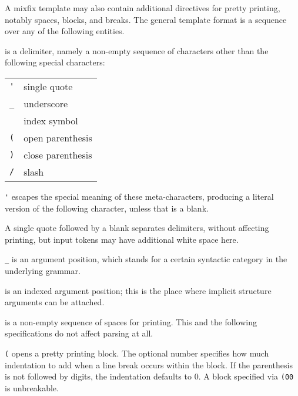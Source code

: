 \begin{isabellebody}
\begin{isamarkuptext}
  \medskip A mixfix template may also contain additional directives
  for pretty printing, notably spaces, blocks, and breaks.  The
  general template format is a sequence over any of the following
  entities.

  \begin{description}

  \item {} is a delimiter, namely a non-empty sequence of
  characters other than the following special characters:

  \smallskip
  \begin{tabular}{ll}
    \verb|'| & single quote \\
    \verb|_| & underscore \\
    \isa{{\isachardoublequote}{\isasymindex}{\isachardoublequote}} & index symbol \\
    \verb|(| & open parenthesis \\
    \verb|)| & close parenthesis \\
    \verb|/| & slash \\
  \end{tabular}
  \medskip

  \item \verb|'| escapes the special meaning of these
  meta-characters, producing a literal version of the following
  character, unless that is a blank.

  A single quote followed by a blank separates delimiters, without
  affecting printing, but input tokens may have additional white space
  here.

  \item \verb|_| is an argument position, which stands for a
  certain syntactic category in the underlying grammar.

  \item \isa{{\isachardoublequote}{\isasymindex}{\isachardoublequote}} is an indexed argument position; this is the place
  where implicit structure arguments can be attached.

  \item {} is a non-empty sequence of spaces for printing.
  This and the following specifications do not affect parsing at all.

  \item \verb|(| opens a pretty printing block.  The
  optional number specifies how much indentation to add when a line
  break occurs within the block.  If the parenthesis is not followed
  by digits, the indentation defaults to 0.  A block specified via
  \verb|(00| is unbreakable.


\end{description}
\end{isamarkuptext}
\end{isabellebody}
